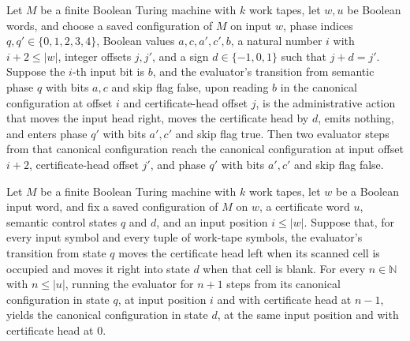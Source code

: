 \begin{lemma}
\label{Complexity.satEval_double}
\leanok
{}
Let $M$ be a finite Boolean Turing machine with $k$ work tapes, let $w,u$ be Boolean
words, and choose a saved configuration of $M$ on input $w$, phase indices
$q,q'\in\{0,1,2,3,4\}$, Boolean values $a,c,a',c',b$, a natural number $i$ with $i+2\le
|w|$, integer offsets $j,j'$, and a sign $d\in\{-1,0,1\}$ such that $j+d=j'$. Suppose
the $i$-th input bit is $b$, and the evaluator's transition from semantic phase $q$ with
bits $a,c$ and skip flag false, upon reading $b$ in the canonical configuration at
offset $i$ and certificate-head offset $j$, is the administrative action that moves the
input head right, moves the certificate head by $d$, emits nothing, and enters phase
$q'$ with bits $a',c'$ and skip flag true. Then two evaluator steps from that canonical
configuration reach the canonical configuration at input offset $i+2$, certificate-head
offset $j'$, and phase $q'$ with bits $a',c'$ and skip flag false.
\end{lemma}

\begin{lemma}
\label{Complexity.satEval_rewind}
\leanok
{}
Let $M$ be a finite Boolean Turing machine with $k$ work tapes, let $w$ be a Boolean
input word, and fix a saved configuration of $M$ on $w$, a certificate word $u$,
semantic control states $q$ and $d$, and an input position $i\le |w|$. Suppose that, for
every input symbol and every tuple of work-tape symbols, the evaluator's transition from
state $q$ moves the certificate head left when its scanned cell is occupied and moves it
right into state $d$ when that cell is blank. For every $n\in\mathbb N$ with $n\le |u|$,
running the evaluator for $n+1$ steps from its canonical configuration in state $q$, at
input position $i$ and with certificate head at $n-1$, yields the canonical
configuration in state $d$, at the same input position and with certificate head at $0$.
\end{lemma}

